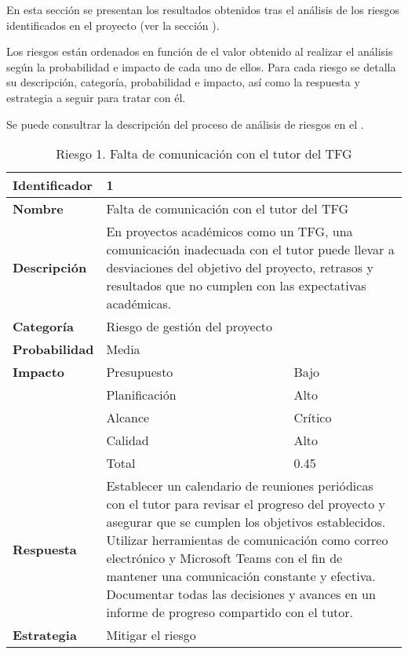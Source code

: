En esta sección se presentan los resultados obtenidos tras el análisis de los riesgos identificados en el proyecto (ver la sección ).

Los riesgos están ordenados en función de el valor obtenido al realizar el análisis según la probabilidad e impacto de cada uno de ellos.
Para cada riesgo se detalla su descripción, categoría, probabilidad e impacto, así como la respuesta y estrategia a seguir para tratar con él.

Se puede consultrar la descripción del proceso de análisis de riesgos en el .
\begin{table}[H]
    \centering
    \caption{Riesgo 1. Falta de comunicación con el tutor del TFG}
    \label{table:risk_comunicacion-tutor}
    \begin{tabular}{>{\columncolor{lightgreen!20}}l l l}
    \toprule
    \rowcolor{lightgreen}
    \textbf{Identificador} & \multicolumn{2}{l}{1} \\
    \midrule
    \textbf{Nombre} & \multicolumn{2}{l}{Falta de comunicación con el tutor del TFG} \\
    \midrule
    \textbf{Descripción} & \multicolumn{2}{p{10cm}}{En proyectos académicos como un TFG, una comunicación inadecuada con el tutor puede llevar a desviaciones del objetivo del proyecto, retrasos y resultados que no cumplen con las expectativas académicas.} \\
    \midrule
    \textbf{Categoría} & \multicolumn{2}{l}{Riesgo de gestión del proyecto} \\
    \midrule
    \textbf{Probabilidad} & \multicolumn{2}{l}{Media} \\
    \midrule
    \textbf{Impacto} & Presupuesto & Bajo \\
    \cmidrule(lr){2-3}
    & Planificación & Alto \\
    \cmidrule(lr){2-3}
    & Alcance & Crítico \\
    \cmidrule(lr){2-3}
    & Calidad & Alto \\
    \cmidrule(lr){2-3}
    & Total & 0.45 \\
    \midrule
    \textbf{Respuesta} & \multicolumn{2}{p{10cm}}{Establecer un calendario de reuniones periódicas con el tutor para revisar el progreso del proyecto y asegurar que se cumplen los objetivos establecidos. Utilizar herramientas de comunicación como correo electrónico y Microsoft Teams con el fin de mantener una comunicación constante y efectiva. Documentar todas las decisiones y avances en un informe de progreso compartido con el tutor.} \\
    \midrule
    \textbf{Estrategia} & \multicolumn{2}{l}{Mitigar el riesgo} \\
    \bottomrule
    \end{tabular}
\end{table}


